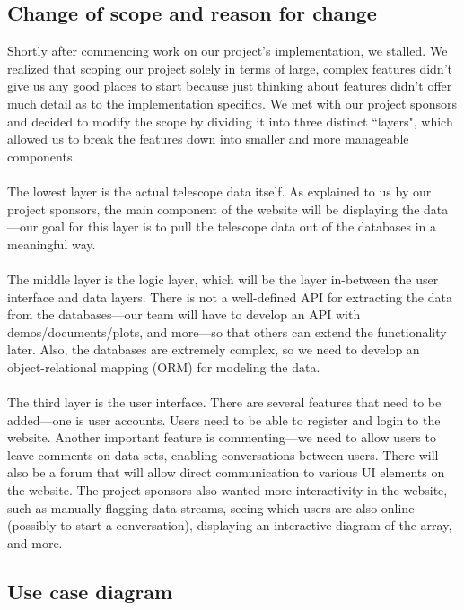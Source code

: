 \documentclass[12pt]{article}
\begin{document}
\begin{spacing}{1.5}
\subsection{Change of scope and reason for change}
Shortly after commencing work on our project's implementation, we stalled. We realized that scoping our project solely in terms of large, complex features didn't give us any good places to start because just thinking about features didn't offer much detail as to the implementation specifics. We met with our project sponsors and decided to modify the scope by dividing it into three distinct ``layers", which allowed us to break the features down into smaller and more manageable components.
\\ \\
The lowest layer is the actual telescope data itself. As explained to us by our project sponsors, the main component of the website will be displaying the data---our goal for this layer is to pull the telescope data out of the databases in a meaningful way.
\\ \\
The middle layer is the logic layer, which will be the layer in-between the user interface and data layers. There is not a well-defined API for extracting the data from the databases---our team will have to develop an API with demos/documents/plots, and more---so that others can extend the functionality later. Also, the databases are extremely complex, so we need to develop an object-relational mapping (ORM) for modeling the data. 
\\ \\
The third layer is the user interface. There are several features that need to be added---one is user accounts. Users need to be able to register and login to the website. Another important feature is commenting---we need to allow users to leave comments on data sets, enabling conversations between users. There will also be a forum that will allow direct communication to various UI elements on the website. The project sponsors also wanted more interactivity in the website, such as manually flagging data streams, seeing which users are also online (possibly to start a conversation), displaying an interactive diagram of the array, and more.

\subsection{Use case diagram}

\end{spacing}
\end{document}

